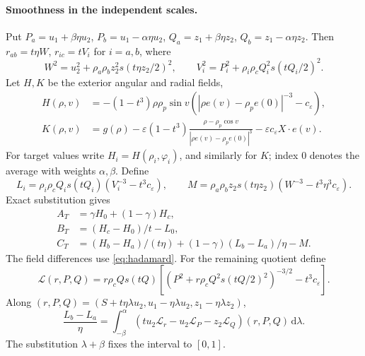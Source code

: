 \documentclass[11pt,a4paper]{article}
\numberwithin{equation}{section}
\theoremstyle{remark}
\newcommand{\eps}{\varepsilon}
\newcommand{\dd}{\,\mathrm d}
\begin{document}
\paragraph{Smoothness in the independent scales.}
Put $P_a=u_1+\beta\eta u_2$, $P_b=u_1-\alpha\eta u_2$, $Q_a=z_1+\beta\eta z_2$, $Q_b=z_1-\alpha\eta z_2$. Then $r_{ab}=t\eta W$, $r_{ic}=tV_i$ for $i=a,b$, where
\begin{equation}\label{eq:nest-distances}
 W^2=u_2^2+\rho_a\rho_bz_2^2s(t\eta z_2/2)^2,\qquad
 V_i^2=P_i^2+\rho_i\rho_cQ_i^2s(tQ_i/2)^2.
\end{equation}
Let $H,K$ be the exterior angular and radial fields,
\[
 \begin{aligned}
 H(\rho,v)&=-(1-t^3)\rho\rho_p\sin v
 (|\rho e(v)-\rho_pe(0)|^{-3}-c_\eps),\\
 K(\rho,v)&=g(\rho)-\eps(1-t^3)
 \frac{\rho-\rho_p\cos v}{|\rho e(v)-\rho_pe(0)|^3}-\eps c_\eps X\cdot e(v).
 \end{aligned}
\]
For target values write $H_i=H(\rho_i,\varphi_i)$, and similarly for $K$; index $0$ denotes the average with weights $\alpha,\beta$. Define
\[
 L_i=\rho_i\rho_cQ_i s(tQ_i)(V_i^{-3}-t^3c_\eps),\qquad
 M=\rho_a\rho_bz_2s(t\eta z_2)(W^{-3}-t^3\eta^3c_\eps).
\]
Exact substitution gives
\begin{equation}\label{eq:nest-angular}
 \begin{aligned}
 A_T&=\gamma H_0+(1-\gamma)H_c,\\
 B_T&=(H_c-H_0)/t-L_0,\\
 C_T&=(H_b-H_a)/(t\eta)+(1-\gamma)(L_b-L_a)/\eta-M.
 \end{aligned}
\end{equation}
The field differences use \eqref{eq:hadamard}. For the remaining quotient define
\[
 \mathcal L(r,P,Q)=r\rho_cQ s(tQ)
 [(P^2+r\rho_cQ^2s(tQ/2)^2)^{-3/2}-t^3c_\eps].
\]
Along $(r,P,Q)=(S+t\eta\lambda u_2,u_1-\eta\lambda u_2,z_1-\eta\lambda z_2)$,
\begin{equation}\label{eq:nest-kernel-difference}
 \frac{L_b-L_a}{\eta}
 =\int_{-\beta}^{\alpha}
 (tu_2\mathcal L_r-u_2\mathcal L_P-z_2\mathcal L_Q)(r,P,Q)\dd\lambda.
\end{equation}
The substitution $\lambda+\beta$ fixes the interval to $[0,1]$.
\end{document}
